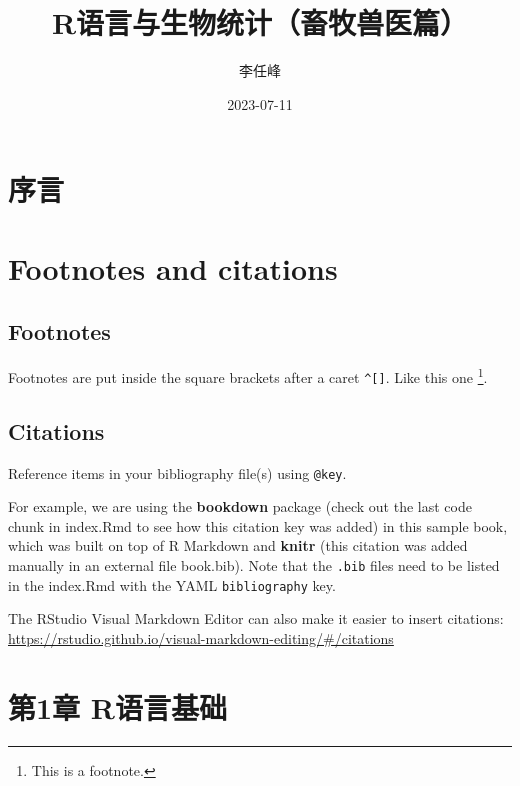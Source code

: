 \documentclass[
]{book}
\title{R语言与生物统计（畜牧兽医篇）}
\author{李任峰}
\date{2023-07-11}
\theoremstyle{definition}
\theoremstyle{definition}
\theoremstyle{definition}
\theoremstyle{definition}
\theoremstyle{remark}
\begin{document}
\maketitle

{
\setcounter{tocdepth}{1}
\tableofcontents
}
\hypertarget{ux5e8fux8a00}{%
\chapter*{序言}\label{ux5e8fux8a00}}

\hypertarget{footnotes-and-citations}{%
\chapter{Footnotes and citations}\label{footnotes-and-citations}}

\hypertarget{footnotes}{%
\section{Footnotes}\label{footnotes}}

Footnotes are put inside the square brackets after a caret \texttt{\^{}{[}{]}}. Like this one \footnote{This is a footnote.}.

\hypertarget{citations}{%
\section{Citations}\label{citations}}

Reference items in your bibliography file(s) using \texttt{@key}.

For example, we are using the \textbf{bookdown} package \citep{R-bookdown} (check out the last code chunk in index.Rmd to see how this citation key was added) in this sample book, which was built on top of R Markdown and \textbf{knitr} \citep{xie2015} (this citation was added manually in an external file book.bib).
Note that the \texttt{.bib} files need to be listed in the index.Rmd with the YAML \texttt{bibliography} key.

The RStudio Visual Markdown Editor can also make it easier to insert citations: \url{https://rstudio.github.io/visual-markdown-editing/\#/citations}

\hypertarget{ux7b2c1ux7ae0-rux8bedux8a00ux57faux7840}{%
\chapter*{第1章 R语言基础}\label{ux7b2c1ux7ae0-rux8bedux8a00ux57faux7840}}
\end{document}
